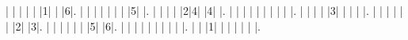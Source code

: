 \begin{sudoku-block}
| | | | | |1| | |6|.
| | | | | | | |5| |.
| | | | |2|4| |4| |.
| | | | | | | | | |.
| | | | |3| | | | |.
| | | | | | |2| |3|.
| | | | | | |5| |6|.
| | | | | | | | | |.
| | |1| | | | | | |.
\end{sudoku-block}